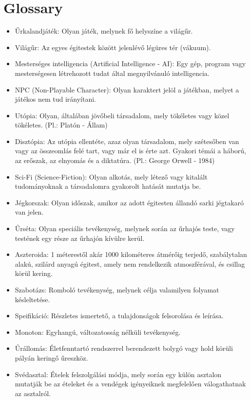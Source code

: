 \documentclass{scrarticle}
\begin{document}
\section{Glossary}
\begin{itemize}
    \item Űrkalandjáték: Olyan játék, melynek fő helyszíne a világűr.
    \item Világűr: Az egyes égitestek között jelenlévő légüres tér (vákuum).
    \item Mesterséges intelligencia (Artificial Intelligence - AI): Egy gép, program vagy mesterségesen létrehozott tudat által megnyilvánuló intelligencia.
    \item NPC (Non-Playable Character): Olyan karaktert jelöl a játékban, melyet a játékos nem tud irányítani.
    \item Utópia: Olyan, általában jövőbeli társadalom, mely tökéletes vagy közel tökéletes. (Pl.: Platón - Állam)
    \item Disztópia: Az utópia ellentéte, azaz olyan társadalom, mely szétesőben van vagy az összeomlás felé tart, vagy már el is érte azt. Gyakori témái a háború, az erőszak, az elnyomás és a diktatúra. (Pl.: George Orwell - 1984)
    \item Sci-Fi (Science-Fiction): Olyan alkotás, mely létező vagy kitalált tudományoknak a társadalomra gyakorolt hatását mutatja be.
    \item Jégkorszak: Olyan időszak, amikor az adott égitesten állandó sarki jégtakaró van jelen.
    \item Űrséta: Olyan speciális tevékenység, melynek során az űrhajós teste, vagy testének egy része az űrhajón kívülre kerül.
    \item Aszteroida: 1 méterestől akár 1000 kilométeres átmérőig terjedő, szabálytalan alakú, szilárd anyagú égitest, amely nem rendelkezik atmoszférával, és csillag körül kering.
    \item Szabotázs: Romboló tevékenység, melynek célja valamilyen folyamat késleltetése.
    \item Speifikáció: Részletes ismertető, a tulajdonságok felsorolása és leírása.
    \item Monoton: Egyhangú, változatosság nélküli tevékenység.
    \item Űrállomás: Életfenntartó rendszerrel berendezett bolygó vagy hold körüli pályán keringő űreszköz.
    \item Svédasztal: Ételek felszolgálási módja, mely során egy külön asztalon mutatják be az ételeket és a vendégek igényeiknek megfelelően válogathatnak az asztalról.

\end{itemize}
\end{document}
